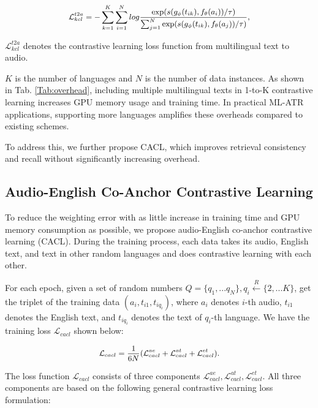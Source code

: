 \begin{equation}
\small
\begin{aligned}
\mathcal{L}^{t2a}_{kcl}=-\sum^K_{k=1}\sum^N_{i=1}log\frac{\exp(s(g_\phi(t_{ik}),f_\theta(a_i))/\tau)}{\sum^N_{j=1}\exp(s(g_\phi(t_{ik}),f_\theta(a_j))/\tau)},
\end{aligned}
\end{equation}

$\mathcal{L}^{t2a}_{kcl}$ denotes the contrastive learning loss function from multilingual text to audio.


$K$ is the number of languages and $N$ is the number of data instances. As shown in Tab. \ref{Tab:overhead}, including multiple multilingual texts in 1-to-K contrastive learning increases GPU memory usage and training time. In practical ML-ATR applications, supporting more languages amplifies these overheads compared to existing schemes.

To address this, we further propose CACL, which improves retrieval consistency and recall without significantly increasing overhead.

\subsection{Audio-English Co-Anchor Contrastive Learning}
To reduce the weighting error with as little increase in training time and GPU memory consumption as possible, we propose audio-English co-anchor contrastive learning (CACL). During the training process, each data takes its audio, English text, and text in other random languages and does contrastive learning with each other. 

For each epoch, given a set of random numbers $Q=\{q_1,...q_N\},q_i\stackrel{R}{\leftarrow}\{2,...K\}$, get the triplet of the training data $(a_i,t_{i1},t_{iq_i})$, where $a_i$ denotes $i$-th audio, $t_{i1}$ denotes the English text, and $t_{iq_i}$ denotes the text of $q_i$-th language. We have the training loss $\mathcal{L}_{cacl}$ shown below:

\begin{equation}
\small
\begin{aligned}
\mathcal{L}_{cacl}=\frac{1}{6N}(\mathcal{L}^{ae}_{cacl}+\mathcal{L}^{at}_{cacl}+\mathcal{L}^{et}_{cacl}).
\end{aligned}
\end{equation}

The loss function $\mathcal{L}_{cacl}$ consists of three components $\mathcal{L}^{ae}_{cacl},\mathcal{L}^{at}_{cacl},\mathcal{L}^{et}_{cacl}$. All three components are based on the following general contrastive learning loss formulation:

